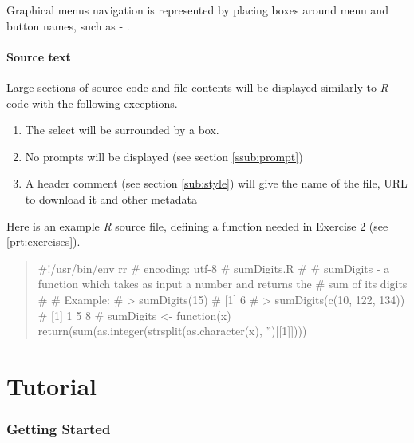 \documentclass[10pt,letterpaper]{article}
\newcommand{\R}{\emph{R} }
\newenvironment{Schunk}{}{}
\begin{document}
Graphical menus navigation is represented by placing boxes around menu and button names, such as  - .

\subsection*{Source text} %
\label{sub:source_text}

Large sections of source code and file contents will be displayed similarly to \R code with the following exceptions.
\begin{enumerate}
  \item The select will be surrounded by a box.
  \item No prompts will be displayed (see section \ref{ssub:prompt})
  \item A header comment (see section \ref{sub:style}) will give the name of the file, URL to download it and other metadata
\end{enumerate}

Here is an example \R source file, defining a function needed in Exercise 2 (see \ref{prt:exercises}).

\begin{quotation}
\begin{Schunk}
\begin{Sinput}
 #!/usr/bin/env rr
 # encoding: utf-8
 # sumDigits.R
 #
 # sumDigits - a function which takes as input a number and returns the
 #            sum of its digits
 #
 # Example:
 #       > sumDigits(15)
 #       [1] 6
 #       > sumDigits(c(10, 122, 134))
 #       [1] 1 5 8
 #
 sumDigits <- function(x) {
   return(sum(as.integer(strsplit(as.character(x), '')[[1]])))
 }
\end{Sinput}
\end{Schunk}
\end{quotation}

\part{Tutorial} %
\label{prt:tutorial}



\section{Getting Started}
\end{document}
